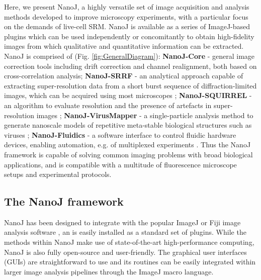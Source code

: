 
 Here, we present NanoJ, a highly versatile set of image acquisition and analysis methods developed to improve microscopy experiments, with a particular focus on the demands of live-cell SRM. NanoJ is available as a series of ImageJ-based plugins which can be used independently or concomitantly to obtain high-fidelity images from which qualitative and quantitative information can be extracted. NanoJ is comprised of (Fig. \ref{fig:GeneralDiagram}): \textbf{NanoJ-Core} - general image correction tools including drift correction and channel realignment, both based on cross-correlation analysis; \textbf{NanoJ-SRRF} - an analytical approach capable of extracting super-resolution data from a short burst sequence of diffraction-limited images, which can be acquired using most microscopes \cite{gustafsson2016fast,culley2018srrf}; \textbf{NanoJ-SQUIRREL} - an algorithm to evaluate resolution and the presence of artefacts in super-resolution images \cite{culley2018quantitative}; \textbf{NanoJ-VirusMapper} - a single-particle analysis method to generate nanoscale models of repetitive meta-stable biological structures such as viruses \cite{Gray2016,Gray2017,gray2018nanoscale}; \textbf{NanoJ-Fluidics} - a software interface to control fluidic hardware devices, enabling automation, e.g. of multiplexed experiments \cite{almada2018automating}. Thus the NanoJ framework is capable of solving common imaging problems with broad biological applications, and is compatible with a multitude of fluorescence microscope setups and experimental protocols. 
 
\subsection*{The NanoJ framework}
 NanoJ has been designed to integrate with the popular ImageJ or Fiji image analysis software \cite{abramoff2004image,schindelin2012fiji}, an is easily installed as a standard set of plugins. While the methods within NanoJ make use of state-of-the-art high-performance computing, NanoJ is also fully open-source and user-friendly. The graphical user interfaces (GUIs) are straightforward to use and its routines can be easily integrated within larger image analysis pipelines through the ImageJ macro language.


